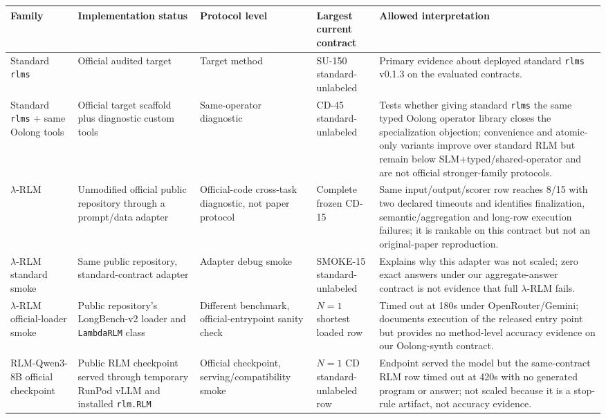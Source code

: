 \documentclass[letterpaper]{article}
\begin{document}
\begin{table}[!t]
\centering
\small
\setlength{\tabcolsep}{3pt}
\begin{tabular}{@{}p{2.3cm}p{3.3cm}p{2.8cm}p{2.2cm}p{4.0cm}@{}}
\toprule
\textbf{Family} & \textbf{Implementation status} & \textbf{Protocol level} & \textbf{Largest current contract} & \textbf{Allowed interpretation} \\
\midrule
Standard \texttt{rlms} & Official audited target & Target method & SU-150 standard-unlabeled & Primary evidence about deployed standard \texttt{rlms} v0.1.3 on the evaluated contracts. \\
Standard \texttt{rlms} + same Oolong tools & Official target scaffold plus diagnostic custom tools & Same-operator diagnostic & CD-45 standard-unlabeled & Tests whether giving standard \texttt{rlms} the same typed Oolong operator library closes the specialization objection; convenience and atomic-only variants improve over standard RLM but remain below SLM+typed/shared-operator and are not official stronger-family protocols. \\
$\lambda$-RLM & Unmodified official public repository through a prompt/data adapter & Official-code cross-task diagnostic, not paper protocol & Complete frozen CD-15 & Same input/output/scorer row reaches 8/15 with two declared timeouts and identifies finalization, semantic/aggregation and long-row execution failures; it is rankable on this contract but not an original-paper reproduction. \\
$\lambda$-RLM standard smoke & Same public repository, standard-contract adapter & Adapter debug smoke & SMOKE-15 standard-unlabeled & Explains why this adapter was not scaled; zero exact answers under our aggregate-answer contract is not evidence that full $\lambda$-RLM fails. \\
$\lambda$-RLM official-loader smoke & Public repository's LongBench-v2 loader and \texttt{LambdaRLM} class & Different benchmark, official-entrypoint sanity check & $N=1$ shortest loaded row & Timed out at 180s under OpenRouter/Gemini; documents execution of the released entry point but provides no method-level accuracy evidence on our Oolong-synth contract. \\
RLM-Qwen3-8B official checkpoint & Public RLM checkpoint served through temporary RunPod vLLM and installed \texttt{rlm.RLM} & Official checkpoint, serving/compatibility smoke & $N=1$ CD standard-unlabeled row & Endpoint served the model but the same-contract RLM row timed out at 420s with no generated program or answer; not scaled because it is a stop-rule artifact, not accuracy evidence. \\

\end{tabular}
\end{table}
\end{document}

